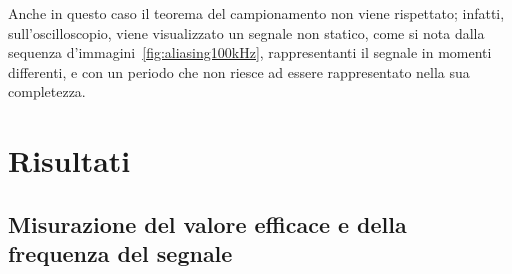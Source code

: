 \documentclass{article}
\begin{document}
				\newpage
				Anche in questo caso il teorema del campionamento non viene rispettato; infatti, sull’oscilloscopio, viene visualizzato un segnale non statico, come si nota dalla sequenza d'immagini~\ref{fig:aliasing100kHz}, rappresentanti il segnale in momenti differenti, e con un periodo che non riesce ad essere rappresentato nella sua completezza.
	\section{Risultati}
		\subsection{Misurazione del valore efficace e della frequenza del segnale}
\end{document}
